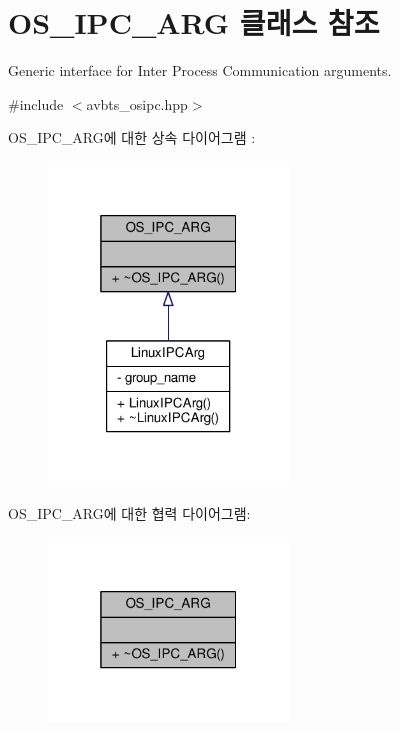 \hypertarget{class_o_s___i_p_c___a_r_g}{}\section{O\+S\+\_\+\+I\+P\+C\+\_\+\+A\+RG 클래스 참조}
\label{class_o_s___i_p_c___a_r_g}


Generic interface for Inter Process Communication arguments.  




{\ttfamily \#include $<$avbts\+\_\+osipc.\+hpp$>$}



O\+S\+\_\+\+I\+P\+C\+\_\+\+A\+R\+G에 대한 상속 다이어그램 \+: 
\nopagebreak
\begin{figure}[H]
\begin{center}
\leavevmode
\includegraphics[width=181pt]{class_o_s___i_p_c___a_r_g__inherit__graph}
\end{center}
\end{figure}


O\+S\+\_\+\+I\+P\+C\+\_\+\+A\+R\+G에 대한 협력 다이어그램\+:
\nopagebreak
\begin{figure}[H]
\begin{center}
\leavevmode
\includegraphics[width=181pt]{class_o_s___i_p_c___a_r_g__coll__graph}
\end{center}
\end{figure}
